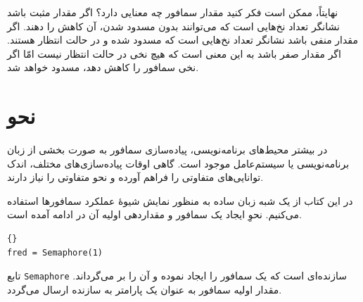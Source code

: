 \documentclass{book}
\begin{document}
    نهایتاً، ممکن است فکر کنید مقدار سمافور چه معنایی دارد؟ 
    اگر مقدار مثبت باشد نشانگر تعداد نخ‌هایی است که می‌توانند بدون مسدود شدن، آن کاهش را دهند.
    اگر مقدار منفی باشد نشانگر تعداد نخ‌هایی است که مسدود شده و در حالت انتظار هستند. 
    اگر مقدار صفر باشد به این معنی است که هیچ نخی در حالت انتظار نیست امّا اگر نخی سمافور را کاهش دهد، مسدود خواهد شد.
    

\section{نحو}

    در بیشتر محیط‌های برنامه‌نویسی، پیاده‌سازی سمافور به صورت بخشی از زبان برنامه‌نویسی یا سیستم‌عامل موجود است. 
    گاهی اوقات پیاده‌سازی‌های مختلف،‌ اندک توانایی‌های متفاوتی را فراهم آورده و نحو متفاوتی را نیاز دارند.

    در این کتاب از یک شبه زبان ساده به منظور نمایش شیوهٔ عملکرد سمافورها استفاده می‌کنیم. 
    نحوِ ایجاد یک سمافور و مقداردهی اولیه آن در ادامه آمده است.
%
\begin{latin}
\begin{lstlisting}[title=\rl{نحوِ مقداردهی اولیه سمافور}]{}
fred = Semaphore(1)
\end{lstlisting}
\end{latin}
%
    تابع \texttt{Semaphore} سازنده‌ای است که یک سمافور را ایجاد نموده 
    و آن را بر می‌گرداند. مقدار اولیه سمافور به عنوان یک پارامتر به سازنده ارسال می‌گردد. 
\end{document}
